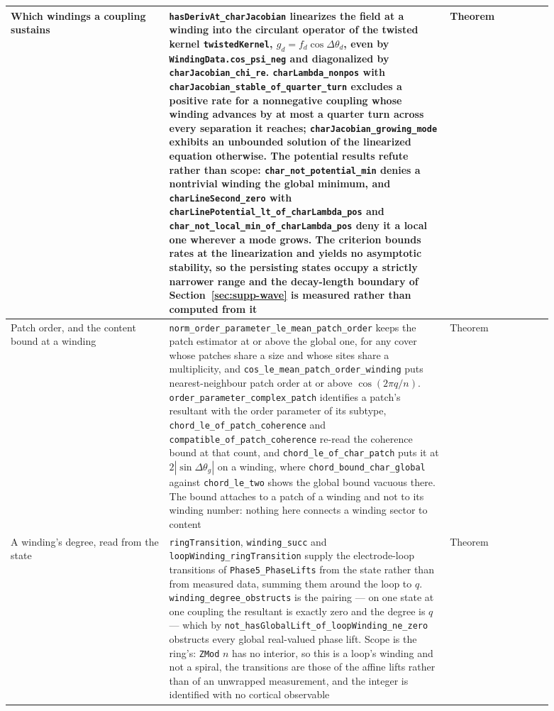\documentclass{article}
\begin{document}
\begin{longtable}{|>{\raggedright\arraybackslash}p{0.26\linewidth}|>{\raggedright\arraybackslash}p{0.46\linewidth}|>{\raggedright\arraybackslash}p{0.17\linewidth}|}
Which windings a coupling sustains & \nolinkurl{hasDerivAt_charJacobian} linearizes the field at a winding into the circulant operator of the twisted kernel \texttt{twistedKernel}, $g_d=f_d\cos\Delta\theta_d$, even by \nolinkurl{WindingData.cos_psi_neg} and diagonalized by \nolinkurl{charJacobian_chi_re}. \nolinkurl{charLambda_nonpos} with \nolinkurl{charJacobian_stable_of_quarter_turn} excludes a positive rate for a nonnegative coupling whose winding advances by at most a quarter turn across every separation it reaches; \nolinkurl{charJacobian_growing_mode} exhibits an unbounded solution of the linearized equation otherwise. The potential results refute rather than scope: \nolinkurl{char_not_potential_min} denies a nontrivial winding the global minimum, and \nolinkurl{charLineSecond_zero} with \nolinkurl{charLinePotential_lt_of_charLambda_pos} and \nolinkurl{char_not_local_min_of_charLambda_pos} deny it a local one wherever a mode grows. The criterion bounds rates at the linearization and yields no asymptotic stability, so the persisting states occupy a strictly narrower range and the decay-length boundary of Section~\ref{sec:supp-wave} is measured rather than computed from it & Theorem \\ \hline
Patch order, and the content bound at a winding & \nolinkurl{norm_order_parameter_le_mean_patch_order} keeps the patch estimator at or above the global one, for any cover whose patches share a size and whose sites share a multiplicity, and \nolinkurl{cos_le_mean_patch_order_winding} puts nearest-neighbour patch order at or above $\cos(2\pi q/n)$. \nolinkurl{order_parameter_complex_patch} identifies a patch's resultant with the order parameter of its subtype, \nolinkurl{chord_le_of_patch_coherence} and \nolinkurl{compatible_of_patch_coherence} re-read the coherence bound at that count, and \nolinkurl{chord_le_of_char_patch} puts it at $2|\sin\Delta\theta_g|$ on a winding, where \nolinkurl{chord_bound_char_global} against \nolinkurl{chord_le_two} shows the global bound vacuous there. The bound attaches to a patch of a winding and not to its winding number: nothing here connects a winding sector to content & Theorem \\ \hline
A winding's degree, read from the state & \texttt{ringTransition}, \nolinkurl{winding_succ} and \nolinkurl{loopWinding_ringTransition} supply the electrode-loop transitions of \nolinkurl{Phase5_PhaseLifts} from the state rather than from measured data, summing them around the loop to $q$. \nolinkurl{winding_degree_obstructs} is the pairing --- on one state at one coupling the resultant is exactly zero and the degree is $q$ --- which by \nolinkurl{not_hasGlobalLift_of_loopWinding_ne_zero} obstructs every global real-valued phase lift. Scope is the ring's: \texttt{ZMod} $n$ has no interior, so this is a loop's winding and not a spiral, the transitions are those of the affine lifts rather than of an unwrapped measurement, and the integer is identified with no cortical observable & Theorem \\ \hline

\end{longtable}
\end{document}
